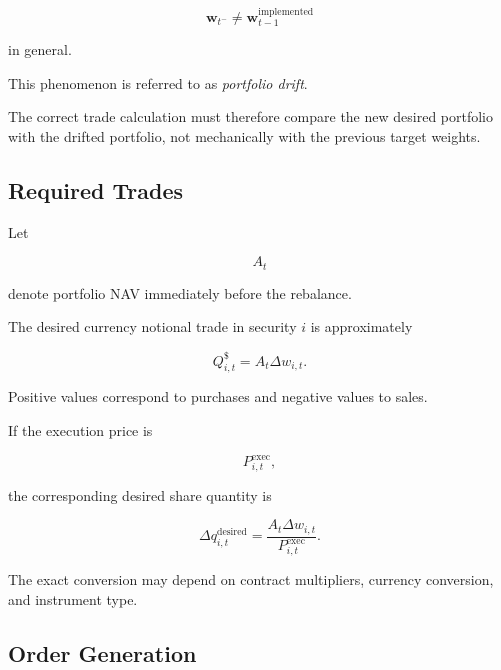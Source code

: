 \documentclass[11pt,a4paper]{article}
\begin{document}
\begin{equation}
\boxed{
\mathbf{w}_{t^-}
\neq
\mathbf{w}_{t-1}^{\mathrm{implemented}}
}
\end{equation}

in general.

This phenomenon is referred to as \emph{portfolio drift}.

The correct trade calculation must therefore compare the new desired portfolio
with the drifted portfolio, not mechanically with the previous target weights.


\subsection{Required Trades}

Let

\begin{equation}
A_t
\end{equation}

denote portfolio NAV immediately before the rebalance.

The desired currency notional trade in security $i$ is approximately

\begin{equation}
\boxed{
Q_{i,t}^{\$}
=
A_t
\Delta w_{i,t}.
}
\end{equation}

Positive values correspond to purchases and negative values to sales.

If the execution price is

\begin{equation}
P_{i,t}^{\mathrm{exec}},
\end{equation}

the corresponding desired share quantity is

\begin{equation}
\boxed{
\Delta q_{i,t}^{\mathrm{desired}}
=
\frac{
A_t\Delta w_{i,t}
}{
P_{i,t}^{\mathrm{exec}}
}.
}
\end{equation}

The exact conversion may depend on contract multipliers, currency conversion,
and instrument type.


\subsection{Order Generation}
\end{document}
